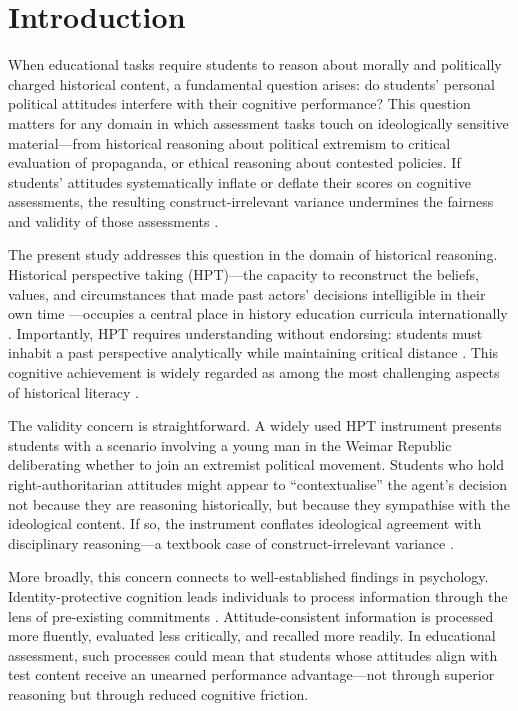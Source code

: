 \documentclass[pdflatex,sn-apa]{sn-jnl}%
\begin{document}

\section{Introduction}\label{sec:intro}

When educational tasks require students to reason about morally and politically charged historical content, a fundamental question arises: do students' personal political attitudes interfere with their cognitive performance? This question matters for any domain in which assessment tasks touch on ideologically sensitive material---from historical reasoning about political extremism to critical evaluation of propaganda, or ethical reasoning about contested policies. If students' attitudes systematically inflate or deflate their scores on cognitive assessments, the resulting construct-irrelevant variance undermines the fairness and validity of those assessments \citep{Messick1995, AERA2014}.

The present study addresses this question in the domain of historical reasoning. Historical perspective taking (HPT)---the capacity to reconstruct the beliefs, values, and circumstances that made past actors' decisions intelligible in their own time \citep{Lee2001, Hartmann2008}---occupies a central place in history education curricula internationally \citep{Seixas2013, vanDrie2007, Wineburg2001}. Importantly, HPT requires understanding without endorsing: students must inhabit a past perspective analytically while maintaining critical distance \citep{Lee2001}. This cognitive achievement is widely regarded as among the most challenging aspects of historical literacy \citep{Wineburg2001, Seixas2017}.

The validity concern is straightforward. A widely used HPT instrument \citep{Hartmann2008} presents students with a scenario involving a young man in the Weimar Republic deliberating whether to join an extremist political movement. Students who hold right-authoritarian attitudes might appear to ``contextualise'' the agent's decision not because they are reasoning historically, but because they sympathise with the ideological content. If so, the instrument conflates ideological agreement with disciplinary reasoning---a textbook case of construct-irrelevant variance \citep{Messick1995}.

More broadly, this concern connects to well-established findings in psychology. Identity-protective cognition leads individuals to process information through the lens of pre-existing commitments \citep{Kahan2017, Jost2003}. Attitude-consistent information is processed more fluently, evaluated less critically, and recalled more readily. In educational assessment, such processes could mean that students whose attitudes align with test content receive an unearned performance advantage---not through superior reasoning but through reduced cognitive friction.
\end{document}
